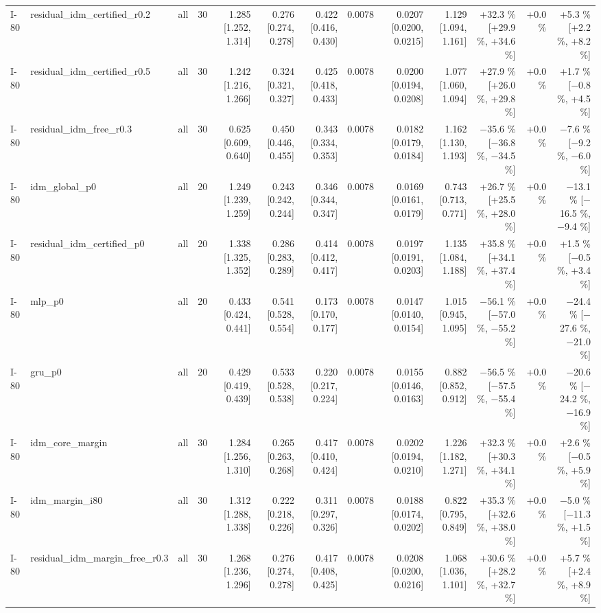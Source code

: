 \begin{table}[htbp]
{\begin{tabular}{lllrrrrrrrrrr}
I-80 & residual\_idm\_certified\_r0.2 & all & 30 & 1.285 [1.252, 1.314] & 0.276 [0.274, 0.278] & 0.422 [0.416, 0.430] & 0.0078 & 0.0207 [0.0200, 0.0215] & 1.129 [1.094, 1.161] & +32.3 \% [+29.9 \%, +34.6 \%] & +0.0 \% & +5.3 \% [+2.2 \%, +8.2 \%] \\
I-80 & residual\_idm\_certified\_r0.5 & all & 30 & 1.242 [1.216, 1.266] & 0.324 [0.321, 0.327] & 0.425 [0.418, 0.433] & 0.0078 & 0.0200 [0.0194, 0.0208] & 1.077 [1.060, 1.094] & +27.9 \% [+26.0 \%, +29.8 \%] & +0.0 \% & +1.7 \% [$-$0.8 \%, +4.5 \%] \\
I-80 & residual\_idm\_free\_r0.3 & all & 30 & 0.625 [0.609, 0.640] & 0.450 [0.446, 0.455] & 0.343 [0.334, 0.353] & 0.0078 & 0.0182 [0.0179, 0.0184] & 1.162 [1.130, 1.193] & $-$35.6 \% [$-$36.8 \%, $-$34.5 \%] & +0.0 \% & $-$7.6 \% [$-$9.2 \%, $-$6.0 \%] \\
I-80 & idm\_global\_p0 & all & 20 & 1.249 [1.239, 1.259] & 0.243 [0.242, 0.244] & 0.346 [0.344, 0.347] & 0.0078 & 0.0169 [0.0161, 0.0179] & 0.743 [0.713, 0.771] & +26.7 \% [+25.5 \%, +28.0 \%] & +0.0 \% & $-$13.1 \% [$-$16.5 \%, $-$9.4 \%] \\
I-80 & residual\_idm\_certified\_p0 & all & 20 & 1.338 [1.325, 1.352] & 0.286 [0.283, 0.289] & 0.414 [0.412, 0.417] & 0.0078 & 0.0197 [0.0191, 0.0203] & 1.135 [1.084, 1.188] & +35.8 \% [+34.1 \%, +37.4 \%] & +0.0 \% & +1.5 \% [$-$0.5 \%, +3.4 \%] \\
I-80 & mlp\_p0 & all & 20 & 0.433 [0.424, 0.441] & 0.541 [0.528, 0.554] & 0.173 [0.170, 0.177] & 0.0078 & 0.0147 [0.0140, 0.0154] & 1.015 [0.945, 1.095] & $-$56.1 \% [$-$57.0 \%, $-$55.2 \%] & +0.0 \% & $-$24.4 \% [$-$27.6 \%, $-$21.0 \%] \\
I-80 & gru\_p0 & all & 20 & 0.429 [0.419, 0.439] & 0.533 [0.528, 0.538] & 0.220 [0.217, 0.224] & 0.0078 & 0.0155 [0.0146, 0.0163] & 0.882 [0.852, 0.912] & $-$56.5 \% [$-$57.5 \%, $-$55.4 \%] & +0.0 \% & $-$20.6 \% [$-$24.2 \%, $-$16.9 \%] \\
I-80 & idm\_core\_margin & all & 30 & 1.284 [1.256, 1.310] & 0.265 [0.263, 0.268] & 0.417 [0.410, 0.424] & 0.0078 & 0.0202 [0.0194, 0.0210] & 1.226 [1.182, 1.271] & +32.3 \% [+30.3 \%, +34.1 \%] & +0.0 \% & +2.6 \% [$-$0.5 \%, +5.9 \%] \\
I-80 & idm\_margin\_i80 & all & 30 & 1.312 [1.288, 1.338] & 0.222 [0.218, 0.226] & 0.311 [0.297, 0.326] & 0.0078 & 0.0188 [0.0174, 0.0202] & 0.822 [0.795, 0.849] & +35.3 \% [+32.6 \%, +38.0 \%] & +0.0 \% & $-$5.0 \% [$-$11.3 \%, +1.5 \%] \\
I-80 & residual\_idm\_margin\_free\_r0.3 & all & 30 & 1.268 [1.236, 1.296] & 0.276 [0.274, 0.278] & 0.417 [0.408, 0.425] & 0.0078 & 0.0208 [0.0200, 0.0216] & 1.068 [1.036, 1.101] & +30.6 \% [+28.2 \%, +32.7 \%] & +0.0 \% & +5.7 \% [+2.4 \%, +8.9 \%] \\

\end{tabular}}
\end{table}
